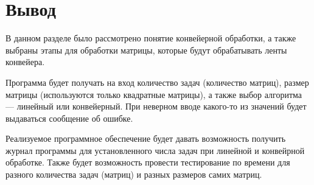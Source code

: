 \section*{Вывод}
В данном разделе было рассмотрено понятие конвейерной обработки, а также выбраны этапы для обработки матрицы, которые будут обрабатывать ленты конвейера.

Программа будет получать на вход количество задач (количество матриц), размер матрицы (используются только квадратные матрицы), а также выбор алгоритма --- линейный или конвейерный. При неверном вводе какого-то из значений будет выдаваться сообщение об ошибке.

Реализуемое программное обеспечение будет давать возможность получить журнал программы для установленного числа задач при линейной и конвейрной обработке. 
Также будет возможность провести тестирование по времени для разного количества задач (матриц) и разных размеров самих матриц.
